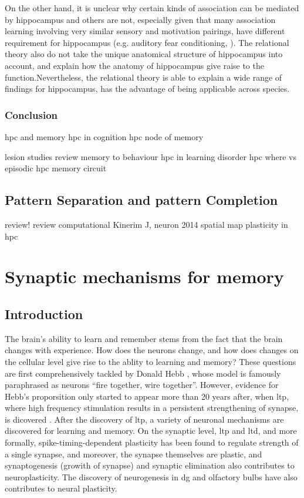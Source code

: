 On the other hand, it is unclear why certain kinds of association can be mediated by hippocampus and others are not, especially given that many association learning involving very similar sensory and motivation pairings, have different requirement for hippocampus (e.g. auditory fear conditioning, \citep{phillips92}). The relational theory also do not take the unique anatomical structure of hippocampus into account, and explain how the anatomy of hippocampus give raise to the function.Nevertheless, the relational theory is able to explain a wide range of findings for hippocampus, has the advantage of being applicable across species.

\subsubsection{Conclusion}
\citep{opitz14} hpc and memory
\citep{shohamy13} hpc in cognition
\citep{huijgen15} hpc node of memory

\citep{lee16} lesion studies review
\citep{mcdonald13} memory to behaviour
\citep{middei14} hpc in learning disorder
\citep{eichenbaum14} hpc where vs episodic
\citep{sasaki15} hpc memory circuit

\subsection{Pattern Separation and pattern Completion \label{pattern}}
\citep{knierim16} review!
\citep{rolls13} review
\citep{kesner15} computational
    Kinerim J, neuron 2014
    \citep{mehta15} spatial map plasticity in hpc

\section{Synaptic mechanisms for memory}
\subsection{Introduction}
The brain's ability to learn and remember stems from the fact that the brain changes with experience. How does the neurons change, and how does changes on the cellular level give rise to the ablity to learning and memory? These questions are first comprehensively tackled by Donald Hebb \citeyear{hebb49}, whose model is famously paraphrased as neurons ``fire together, wire together''. However, evidence for Hebb's proporsition only started to appear more than 20 years after, when \gls{ltp}, where high frequency stimulation results in a persistent strengthening of synapse, is dicovered \citep{bliss73}. After the discovery of \gls{ltp}, a variety of neuronal mechanisms are discovered for learning and memory. On the synaptic level, \gls{ltp} and \gls{ltd}, and more formally, spike-timing-dependent plasticity has been found to regulate strength of a single synapse, and moreover, the synapse themselves are plastic, and synaptogenesis (growith of synapse) and synaptic elimination also contributes to neuroplasticity. The discovery of neurogenesis in \gls{dg} and olfactory bulbs have also contributes to neural plasticity.

